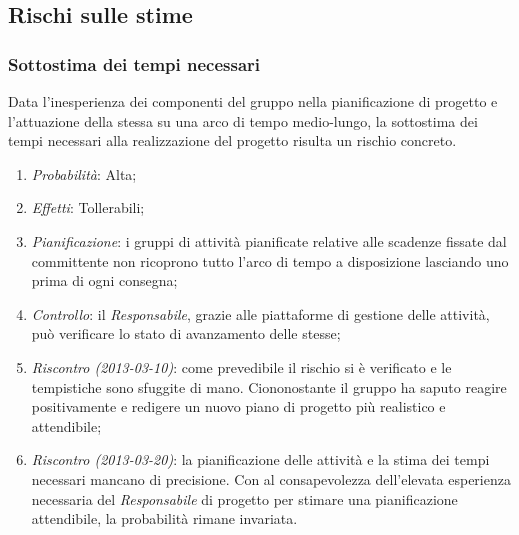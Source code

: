 	\subsection{Rischi sulle stime}
	
		\subsubsection{Sottostima dei tempi necessari}

Data l'inesperienza dei componenti del gruppo nella pianificazione di progetto e l'attuazione della stessa su una arco di tempo medio-lungo, la sottostima dei tempi necessari alla realizzazione del progetto risulta un rischio concreto.

\begin{enumerate}
\item \textit{Probabilità}: Alta;
\item \textit{Effetti}: Tollerabili;
\item \textit{Pianificazione}: i gruppi di attività pianificate relative alle scadenze fissate dal committente non ricoprono tutto l'arco di tempo a disposizione lasciando uno  prima di ogni consegna; 
\item \textit{Controllo}: il \textit{Responsabile}, grazie alle piattaforme di gestione delle attività, può verificare lo stato di avanzamento delle stesse;
\item \textit{Riscontro (2013-03-10)}: come prevedibile il rischio si è verificato e le tempistiche sono sfuggite di mano. Ciononostante il gruppo ha saputo reagire positivamente e redigere un nuovo piano di progetto più realistico e attendibile;
\item \textit{Riscontro (2013-03-20)}: la pianificazione delle attività e la stima dei tempi necessari mancano di precisione. Con al consapevolezza dell'elevata esperienza necessaria del \emph{Responsabile} di progetto per stimare una pianificazione attendibile, la probabilità rimane invariata.
\end{enumerate}
